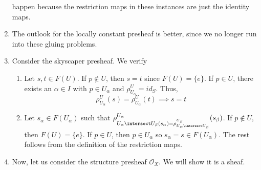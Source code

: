 \documentclass[11pt,leqno,oneside]{amsbook}
\renewcommand{\F}{F}
\renewcommand{\O}{\mathcal{O}}
\numberwithin{thm}{section}
\begin{document}
\begin{example}
\begin{enumerate}[label=(\arabic*)]
    happen because the restriction maps in these instances are just
    the identity maps.
  \item The outlook for the locally constant presheaf is better, since
    we no longer run into these gluing problems.
  \item Consider the skyscaper presheaf. We verify
    \begin{enumerate}
    \item Let \(s,t \in \F(U)\). If \(p \not \in U\), then \(s=t\)
      since \(\F(U) = \{e\}\). If \(p \in U\), there exists an
      \(\alpha \in I\) with \(p \in U_\alpha\) and \(\rho^U_{U_\alpha}
      = id_S\). Thus, \[
        \rho^U_{U_\alpha}(s) = \rho^U_{U_\alpha}(t) \implies s=t
      \]
    \item Let \(s_\alpha \in \F(U_\alpha)\) such that
      \(\rho^{U_\alpha}_{U_\alpha \intersect U_\beta(s_\alpha) =
        \rho^{U_\beta}_{U_\alpha \intersect U_\beta}}(s_\beta)\). If
      \(p \not \in U\), then \(\F(U) = \{e\}\). If \(p \in U\), then
      \(p \in U_\alpha\) so \(s_\alpha = s \in F(U_\alpha)\). The rest
      follows from the definition of the restriction maps.
    \end{enumerate}
  \item Now, let us consider the structure presheaf \(\O_X\). We will
    show it is a sheaf. 
  \end{enumerate}
\end{example}

\begin{bibdiv}
  \begin{biblist}
  \end{biblist}
\end{bibdiv}
\end{document}
